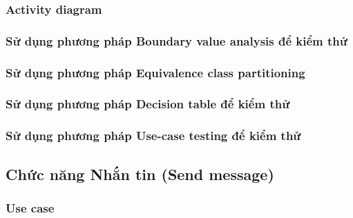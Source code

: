 \documentclass[a4paper, 12pt]{article}
\begin{document}
\subsubsection{Activity diagram}
\subsubsection{Sử dụng phương pháp Boundary value analysis để kiểm thử}
\subsubsection{Sử dụng phương pháp Equivalence class partitioning}
\subsubsection{Sử dụng phương pháp Decision table để kiểm thử}
\subsubsection{Sử dụng phương pháp Use-case testing để kiểm thử}

\subsection{Chức năng Nhắn tin (Send message)}
\subsubsection{Use case}
\end{document}
